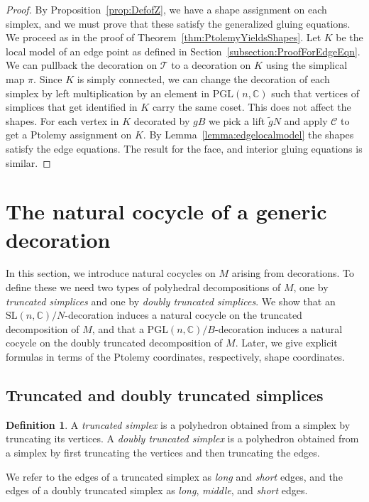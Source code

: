 \documentclass[12pt]{amsart}
\theoremstyle{definition}
\newtheorem{definition}[theorem]{Definition}
\numberwithin{equation}{section}
\def\SL{\mathrm{SL}}
\def\PGL{\mathrm{PGL}}
\def\C{\mathbb{C}}
\def\T{\mathcal{T}}
\begin{document}
\begin{proof}
By Proposition~\ref{prop:DefofZ}, we have a shape assignment on each simplex, and we must prove that these satisfy the generalized gluing equations. We proceed as in the proof of Theorem~\ref{thm:PtolemyYieldsShapes}. Let $K$ be the local model of an edge point as defined in Section~\ref{subsection:ProofForEdgeEqn}. We can pullback the decoration on $\T$ to a decoration on $K$ using the simplical map $\pi$. Since $K$ is simply connected, we can change the decoration of each simplex by left multiplication by an element in $\PGL(n,\C)$ such that vertices of simplices that get identified in $K$ carry the same coset. This does not affect the shapes. For each vertex in $K$ decorated by $gB$ we pick a lift $\tilde{g}N$ and apply $\mathcal C$ to get a Ptolemy assignment on $K$. By Lemma~\ref{lemma:edgelocalmodel} the shapes satisfy the edge equations. The result for the face, and interior gluing equations is similar.
\end{proof}

\section{The natural cocycle of a generic decoration}\label{sec:NaturalCocycles}
In this section, we introduce natural cocycles on $M$ arising from decorations. To define these we need two types of polyhedral decompositions of $M$, one by \emph{truncated simplices} and one by \emph{doubly truncated simplices}. We show that an $\SL(n,\C)/N$-decoration induces a natural cocycle on the truncated decomposition of $M$, and that a $\PGL(n,\C)/B$-decoration induces a natural cocycle on the doubly truncated decomposition of $M$. Later, we give explicit formulas in terms of the Ptolemy coordinates, respectively, shape coordinates.

\subsection{Truncated and doubly truncated simplices}
\begin{definition}
A \emph{truncated simplex} is a polyhedron obtained from a simplex by truncating its vertices. A \emph{doubly truncated simplex} is a polyhedron obtained from a simplex by first truncating the vertices and then truncating the edges.
\end{definition}
We refer to the edges of a truncated simplex as \emph{long} and \emph{short} edges, and the edges of a doubly truncated simplex as \emph{long}, \emph{middle}, and \emph{short} edges.
\end{document}
